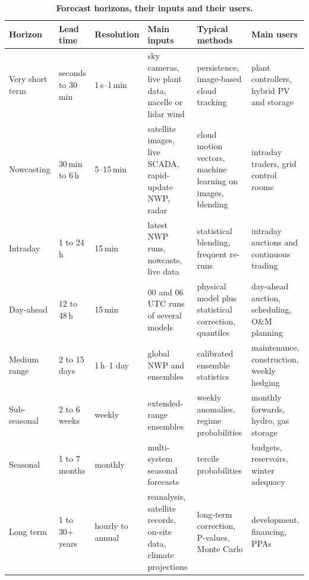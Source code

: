 \begin{table}[t]
\centering\small
\caption{\textbf{Forecast horizons, their inputs and their users.}}
\label{tab:horizons}
\setlength{\tabcolsep}{4pt}
\begin{tabularx}{\textwidth}{@{}L{2.3cm}L{2.0cm}L{1.6cm}YL{3.4cm}L{3.4cm}@{}}
\toprule
Horizon & Lead time & Resolution & Main inputs & Typical methods & Main users \\
\midrule
Very short term & seconds to 30\,min & 1\,s--1\,min & sky cameras, live plant data, nacelle or lidar wind & persistence, image-based cloud tracking & plant controllers, hybrid PV and storage \\
Nowcasting & 30\,min to 6\,h & 5--15\,min & satellite images, live SCADA, rapid-update NWP, radar & cloud motion vectors, machine learning on images, blending & intraday traders, grid control rooms \\
Intraday & 1 to 24\,h & 15\,min & latest NWP runs, nowcasts, live data & statistical blending, frequent re-runs & intraday auctions and continuous trading \\
Day-ahead & 12 to 48\,h & 15\,min & 00 and 06\,UTC runs of several models & physical model plus statistical correction, quantiles & day-ahead auction, scheduling, O\&M planning \\
Medium range & 2 to 15 days & 1\,h--1 day & global NWP and ensembles & calibrated ensemble statistics & maintenance, construction, weekly hedging \\
Sub-seasonal & 2 to 6 weeks & weekly & extended-range ensembles & weekly anomalies, regime probabilities & monthly forwards, hydro, gas storage \\
Seasonal & 1 to 7 months & monthly & multi-system seasonal forecasts & tercile probabilities & budgets, reservoirs, winter adequacy \\
Long term & 1 to 30+ years & hourly to annual & reanalysis, satellite records, on-site data, climate projections & long-term correction, P-values, Monte Carlo & development, financing, PPAs \\
\bottomrule
\end{tabularx}
\end{table}
